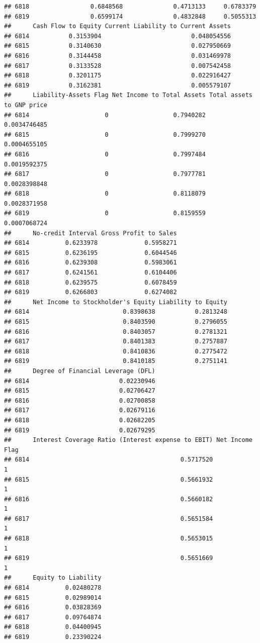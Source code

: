 \documentclass[
]{book}
\begin{document}
\begin{verbatim}
## 6818                 0.6848568              0.4713133     0.6783379
## 6819                 0.6599174              0.4832848     0.5055313
##      Cash Flow to Equity Current Liability to Current Assets
## 6814           0.3153904                         0.048054556
## 6815           0.3140630                         0.027950669
## 6816           0.3144458                         0.031469978
## 6817           0.3133528                         0.007542458
## 6818           0.3201175                         0.022916427
## 6819           0.3162381                         0.005579107
##      Liability-Assets Flag Net Income to Total Assets Total assets to GNP price
## 6814                     0                  0.7940282              0.0034746485
## 6815                     0                  0.7999270              0.0004655105
## 6816                     0                  0.7997484              0.0019592375
## 6817                     0                  0.7977781              0.0028398848
## 6818                     0                  0.8118079              0.0028371958
## 6819                     0                  0.8159559              0.0007068724
##      No-credit Interval Gross Profit to Sales
## 6814          0.6233978             0.5958271
## 6815          0.6236195             0.6044546
## 6816          0.6239308             0.5983061
## 6817          0.6241561             0.6104406
## 6818          0.6239575             0.6078459
## 6819          0.6266803             0.6274082
##      Net Income to Stockholder's Equity Liability to Equity
## 6814                          0.8398638           0.2813248
## 6815                          0.8403590           0.2796055
## 6816                          0.8403057           0.2781321
## 6817                          0.8401383           0.2757887
## 6818                          0.8410836           0.2775472
## 6819                          0.8410185           0.2751141
##      Degree of Financial Leverage (DFL)
## 6814                         0.02230946
## 6815                         0.02706427
## 6816                         0.02700858
## 6817                         0.02679116
## 6818                         0.02682205
## 6819                         0.02679295
##      Interest Coverage Ratio (Interest expense to EBIT) Net Income Flag
## 6814                                          0.5717520               1
## 6815                                          0.5661932               1
## 6816                                          0.5660182               1
## 6817                                          0.5651584               1
## 6818                                          0.5653015               1
## 6819                                          0.5651669               1
##      Equity to Liability
## 6814          0.02480278
## 6815          0.02989014
## 6816          0.03828369
## 6817          0.09764874
## 6818          0.04400945
## 6819          0.23390224
\end{verbatim}
\end{document}

